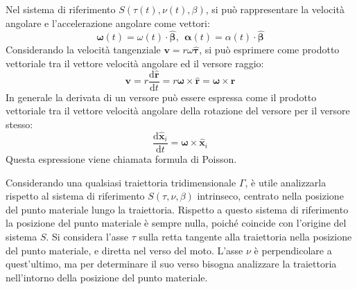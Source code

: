 \documentclass{article}
\newcommand{\vect}[1]{\boldsymbol{\mathbf{#1}}}
\newcommand{\df}{\mathrm{d}}
\numberwithin{equation}{subsection}
\begin{document}
Nel sistema di riferimento $S(\tau(t),\nu(t),\beta)$, 
si può rappresentare 
la velocità angolare e l'accelerazione angolare come vettori:
\begin{equation}
    \vect{\omega}(t)=\omega(t)\cdot\hat{\vect{\beta}}{,}\:\: \vect{\alpha}(t)=\alpha(t)\cdot\hat{\vect{\beta}}
\end{equation}
Considerando la velocità tangenziale $\vect{v}=r\omega\hat{\vect{\tau}}$, si può esprimere come prodotto vettoriale tra il vettore velocità angolare ed il versore raggio: 
\begin{equation*}
    \vect{v}=r\displaystyle\frac{\df\hat{\vect{r}}}{\df t}=r\vect\omega\times\hat{\vect{r}}=\vect\omega\times\vect{r}
\end{equation*}
In generale la derivata di un versore può essere espressa come il prodotto vettoriale tra il vettore velocità angolare della rotazione del versore per il versore stesso:
\begin{equation}
    \displaystyle\frac{\df\hat{\vect{x}}_i}{\df t}=\vect\omega\times\hat{\vect{x}}_i
\end{equation}
Questa espressione viene chiamata formula di Poisson. 

Considerando una qualsiasi traiettoria tridimensionale $\Gamma$, è utile analizzarla rispetto al sistema di riferimento $S(\tau,\nu,\beta)$ intrinseco, centrato nella 
posizione del punto materiale lungo la traiettoria. Rispetto a questo sistema di riferimento la posizione del punto materiale è sempre nulla, poiché coincide con l'origine 
del sistema $S$. Si considera l'asse $\tau$ sulla retta tangente alla traiettoria nella posizione del punto materiale, e diretta nel verso del moto. L'asse $\nu$ è perpendicolare 
a quest'ultimo, ma per determinare il suo verso bisogna analizzare la traiettoria nell'intorno della posizione del punto materiale. 
\end{document}
